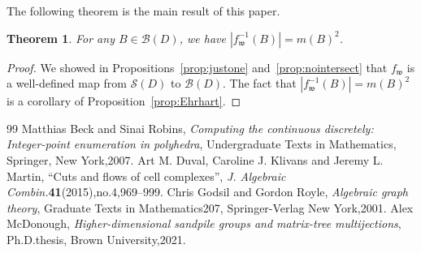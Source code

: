 \documentclass[10pt,a4paper]{amsart}
\newtheorem{theorem}{Theorem}[section]
\theoremstyle{definition}
\newcommand{\B}{\mathcal{B}}
\newcommand{\Sand}{\mathcal{S}}
\newcommand{\w}{\mathfrak w}
\begin{document}
The following theorem is the main result of this paper.


\begin{theorem}\label{thm:Hellyeah}
For any $B\in \B(D)$, we have $|f_{\w}^{-1}(B)| = m(B)^2$.
\end{theorem}

\begin{proof}
We showed in Propositions~\ref{prop:justone} and~\ref{prop:nointersect} that $f_{\w}$ is a well-defined map from $\Sand(D)$ to $\B(D)$. The fact that $|f_{\w}^{-1}(B)| = m(B)^2$ is a corollary of Proposition~\ref{prop:Ehrhart}.
\end{proof}

\begin{thebibliography}{99}
 Matthias Beck and Sinai Robins, \emph{Computing the continuous discretely: Integer-point enumeration in polyhedra}, Undergraduate Texts in Mathematics, Springer, New York,2007.
 Art M. Duval, Caroline J. Klivans and Jeremy L. Martin, ``Cuts and flows of cell complexes'', \emph{J. Algebraic Combin.}\textbf{41}(2015),no.4,969--999.
 Chris Godsil and Gordon Royle, \emph{Algebraic graph theory}, Graduate Texts in Mathematics207, Springer-Verlag New York,2001.
 Alex McDonough, \emph{Higher-dimensional sandpile groups and matrix-tree multijections}, Ph.D.thesis, Brown University,2021.
\end{thebibliography}
\end{document}
